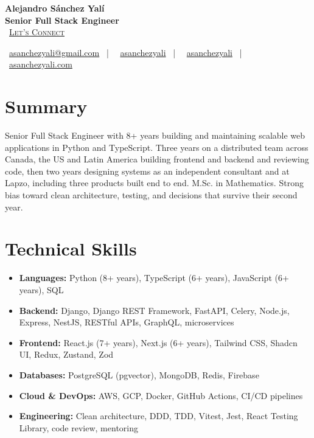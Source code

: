 \documentclass[letterpaper,10pt]{article}
\newcommand{\normalfaCalendar}{{\mdseries\faCalendar}}
\newcommand{\normalfaEnvelope}{{\mdseries\faEnvelope}}
\newcommand{\normalfaLinkedin}{{\mdseries\faLinkedin}}
\newcommand{\normalfaGithub}{{\mdseries\faGithub}}
\newcommand{\normalfaGlobe}{{\mdseries\faGlobe}}
\begin{document}
\begin{center}
\textbf{\LARGE Alejandro S\'anchez Yal\'i}\\[0.2em]
\textbf{\Large Senior Full Stack Engineer}\\[0.4em]
\small
\normalfaCalendar\ \href{https://cal.com/asanchezyali/full-time-opportunities}{\textsc{Let's Connect}}

\vspace{0.5em}
\normalfaEnvelope\ \href{mailto:asanchezyali@gmail.com}{asanchezyali@gmail.com}  ~|~
\normalfaLinkedin\ \href{https://www.linkedin.com/in/asanchezyali}{asanchezyali} ~|~
\normalfaGithub\ \href{https://github.com/asanchezyali}{asanchezyali}  ~|~
\normalfaGlobe\ \href{https://asanchezyali.com}{asanchezyali.com}
\end{center}


\section{Summary}
Senior Full Stack Engineer with 8+ years building and maintaining scalable web applications in Python and TypeScript. Three years on a distributed team across Canada, the US and Latin America building frontend and backend and reviewing code, then two years designing systems as an independent consultant and at Lapzo, including three products built end to end. M.Sc. in Mathematics. Strong bias toward clean architecture, testing, and decisions that survive their second year.

\section{Technical Skills}
\begin{itemize}[leftmargin=*, itemsep=0pt]
  \item \textbf{Languages:} Python (8+ years), TypeScript (6+ years), JavaScript (6+ years), SQL
  \item \textbf{Backend:} Django, Django REST Framework, FastAPI, Celery, Node.js, Express, NestJS, RESTful APIs, GraphQL, microservices
  \item \textbf{Frontend:} React.js (7+ years), Next.js (6+ years), Tailwind CSS, Shadcn UI, Redux, Zustand, Zod
  \item \textbf{Databases:} PostgreSQL (pgvector), MongoDB, Redis, Firebase
  \item \textbf{Cloud \& DevOps:} AWS, GCP, Docker, GitHub Actions, CI/CD pipelines
  \item \textbf{Engineering:} Clean architecture, DDD, TDD, Vitest, Jest, React Testing Library, code review, mentoring
\end{itemize}
\end{document}
